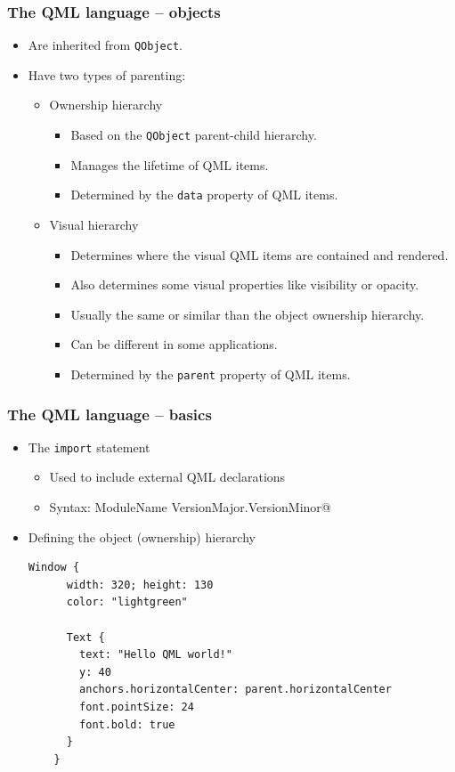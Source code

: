 \begin{frame}
  \frametitle{The QML language -- objects}
  \begin{itemize}
    \item Are inherited from \texttt{QObject}.
    \item Have two types of parenting:
    \begin{itemize}
      \small
      \item Ownership hierarchy
      \begin{itemize}
        \item Based on the \texttt{QObject} parent-child hierarchy.
        \item Manages the lifetime of QML items.
        \item Determined by the \texttt{data} property of QML items.
      \end{itemize}
      \item Visual hierarchy
      \begin{itemize}
        \item Determines where the visual QML items are contained and rendered.
        \item Also determines some visual properties like visibility or opacity.
        \item Usually the same or similar than the object ownership hierarchy.
        \item Can be different in some applications.
        \item Determined by the \texttt{parent} property of QML items.
      \end{itemize}
    \end{itemize}
  \end{itemize}
\end{frame}

\begin{frame}[fragile]
  \frametitle{The QML language -- basics}
  \begin{itemize}
    \item The \texttt{import} statement
    \begin{itemize}
      \footnotesize
      \item Used to include external QML declarations
      \item Syntax: \verb@import ModuleName VersionMajor.VersionMinor@
    \end{itemize}
    \item Defining the object (ownership) hierarchy
    \begin{lstlisting}[basicstyle=\scriptsize\ttfamily]
	Window {
	  width: 320; height: 130
	  color: "lightgreen"

	  Text {
	    text: "Hello QML world!"
	    y: 40
	    anchors.horizontalCenter: parent.horizontalCenter
	    font.pointSize: 24
	    font.bold: true
	  }
	}
    \end{lstlisting}
  \end{itemize}
\end{frame}

